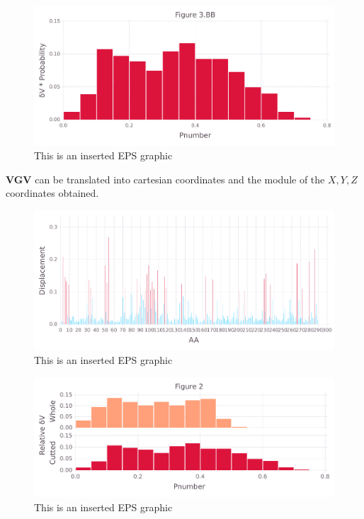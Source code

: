 \documentclass[10pt,letterpaper]{article}
\begin{document}
\begin{figure}[ht]
\begin{center}
\includegraphics[scale=0.5]{1prn/3bbfigure_hi-precision.pdf}
\caption{This is an inserted EPS graphic}
\label{fig11}
\end{center}
\end{figure}

\FloatBarrier


\textbf{VGV} can be translated into cartesian coordinates and the module of the \(X, Y, Z\) coordinates obtained.

\begin{figure}[ht]
\begin{center}
\includegraphics[scale=0.5]{1prn/5figure_hi-precision.pdf}
\caption{This is an inserted EPS graphic}
\label{fig13}
\end{center}
\end{figure}

\begin{figure}[ht]
\begin{center}
\includegraphics[scale=0.5]{1prn/3_both_hi-precision.pdf}
\caption{This is an inserted EPS graphic}
\label{fig13}
\end{center}
\end{figure}
\end{document}
